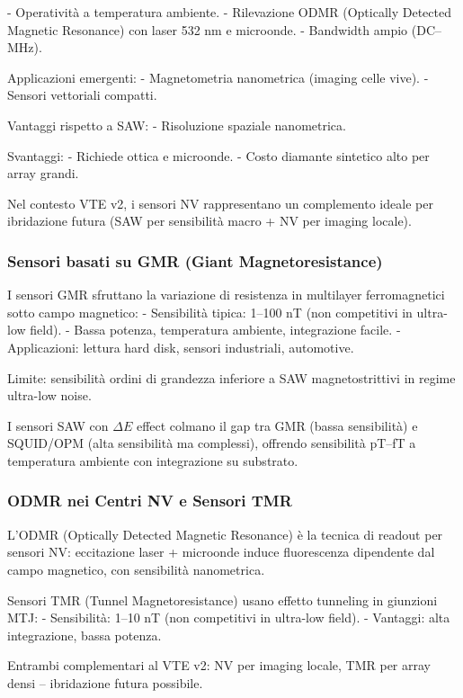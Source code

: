 \documentclass[11pt,a4paper]{article}
\begin{document}
- Operatività a temperatura ambiente.
- Rilevazione ODMR (Optically Detected Magnetic Resonance) con laser 532 nm e microonde.
- Bandwidth ampio (DC–MHz).

Applicazioni emergenti:
- Magnetometria nanometrica (imaging celle vive).
- Sensori vettoriali compatti.

Vantaggi rispetto a SAW:
- Risoluzione spaziale nanometrica.

Svantaggi:
- Richiede ottica e microonde.
- Costo diamante sintetico alto per array grandi.

Nel contesto VTE v2, i sensori NV rappresentano un complemento ideale per ibridazione futura (SAW per sensibilità macro + NV per imaging locale).


\subsubsection{Sensori basati su GMR (Giant Magnetoresistance)}

I sensori GMR sfruttano la variazione di resistenza in multilayer ferromagnetici sotto campo magnetico:
- Sensibilità tipica: 1–100 nT (non competitivi in ultra-low field).
- Bassa potenza, temperatura ambiente, integrazione facile.
- Applicazioni: lettura hard disk, sensori industriali, automotive.

Limite: sensibilità ordini di grandezza inferiore a SAW magnetostrittivi in regime ultra-low noise.

I sensori SAW con $\Delta E$ effect colmano il gap tra GMR (bassa sensibilità) e SQUID/OPM (alta sensibilità ma complessi), offrendo sensibilità pT–fT a temperatura ambiente con integrazione su substrato.


\subsubsection{ODMR nei Centri NV e Sensori TMR}

L'ODMR (Optically Detected Magnetic Resonance) è la tecnica di readout per sensori NV: eccitazione laser + microonde induce fluorescenza dipendente dal campo magnetico, con sensibilità nanometrica.

Sensori TMR (Tunnel Magnetoresistance) usano effetto tunneling in giunzioni MTJ:
- Sensibilità: 1–10 nT (non competitivi in ultra-low field).
- Vantaggi: alta integrazione, bassa potenza.

Entrambi complementari al VTE v2: NV per imaging locale, TMR per array densi – ibridazione futura possibile.
\end{document}
